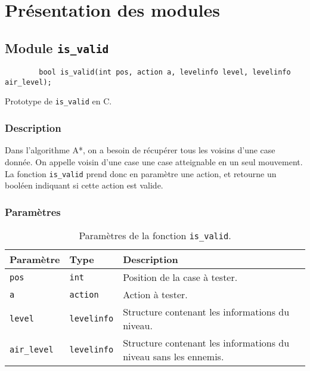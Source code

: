 \chapter{Présentation des modules}
\label{chap:presentation-modules}

\section{Module \texttt{is\_valid}}

\begin{listing}[!htpb]
    \begin{verbatim}
        bool is_valid(int pos, action a, levelinfo level, levelinfo air_level);
    \end{verbatim}
    \caption{Prototype de \texttt{is\_valid} en C.}
    \label{listing:c-is_valid-prototype}
\end{listing}

\subsection{Description}

Dans l'algorithme A*, on a besoin de récupérer tous les voisins d'une case donnée.
On appelle voisin d'une case une case atteignable en un seul mouvement.
\newline\newline
La fonction \texttt{is\_valid} prend donc en paramètre une action, et retourne un booléen indiquant si cette action est valide.

\subsection{Paramètres}

\begin{table}[!htpb]
    \label{tab:parameters-is_valid}
    \begin{tabularx}{\textwidth}{lXX}
        \toprule
        \textbf{Paramètre} & \textbf{Type} & \textbf{Description} \\
        \midrule
        \texttt{pos} & \texttt{int} & Position de la case à tester. \\
        \texttt{a} & \texttt{action} & Action à tester. \\
        \texttt{level} & \texttt{levelinfo} & Structure contenant les informations du niveau. \\
        \texttt{air\_level} & \texttt{levelinfo} & Structure contenant les informations du niveau sans les ennemis. \\
        \bottomrule
    \end{tabularx}
    \caption{Paramètres de la fonction \texttt{is\_valid}.}
\end{table}

